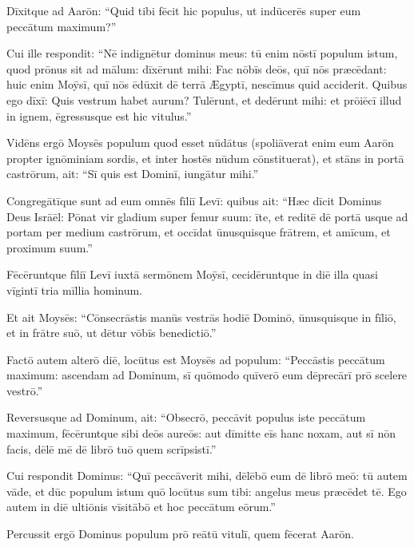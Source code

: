 Dīxitque ad Aarōn: ``Quid
tibi fēcit hic populus, ut indūcerēs super eum peccātum maximum?''

Cui
ille respondit: ``Nē indignētur dominus meus: tū enim nōstī
populum istum, quod prōnus sit ad mālum: 
dīxērunt mihi: Fac nōbīs
deōs, quī nōs præcēdant: huic enim Moȳsī, quī nōs ēdūxit dē terrā Ægyptī,
nescīmus quid acciderit. 
Quibus ego dīxī: Quis vestrum habet aurum?
Tulērunt, et dedērunt mihi: et prōiēcī illud in ignem, ēgressusque est hic
vitulus.'' 

Vidēns ergō Moysēs populum
quod esset nūdātus (spoliāverat enim eum Aarōn propter
ignōminiam sordis, et inter hostēs nūdum cōnstituerat), 
et stāns in portā castrōrum, ait: ``Sī quis est Dominī, iungātur mihi.''

Congregātīque sunt ad eum omnēs fīliī Levī: 
quibus ait: ``Hæc dīcit
Dominus Deus Isrāēl: Pōnat vir gladium super femur suum: īte, et reditē
dē portā usque ad portam per medium castrōrum, et occīdat ūnusquisque
frātrem, et amīcum, et proximum suum.''

Fēcēruntque fīliī Levī iuxtā
sermōnem Moȳsī, cecidēruntque in diē illa quasi vīgintī tria mīllia
hominum. 

Et ait Moysēs: ``Cōnsecrāstis
manūs vestrās hodiē Dominō, ūnusquisque in fīliō, et in frātre suō, ut
dētur vōbīs benedictiō.''

Factō autem alterō diē, locūtus
est Moysēs ad populum: ``Peccāstis peccātum maximum: ascendam ad Dominum,
sī quōmodo quīverō eum dēprecārī prō scelere vestrō.''

Reversusque ad
Dominum, ait: ``Obsecrō, peccāvit populus
iste peccātum maximum, fēcēruntque sibi deōs aureōs: aut dīmitte eīs hanc
noxam, 
aut sī nōn facis, dēlē mē dē librō tuō quem
scrīpsistī.'' 

Cui respondit Dominus: ``Quī peccāverit mihi, dēlēbō eum dē
librō meō: 
tū autem vāde, et dūc populum istum quō locūtus sum tibi:
angelus meus præcēdet tē. Ego autem in diē
ultiōnis vīsitābō et hoc peccātum
eōrum.''

Percussit ergō Dominus populum prō reātū vitulī,
quem fēcerat Aarōn. 
